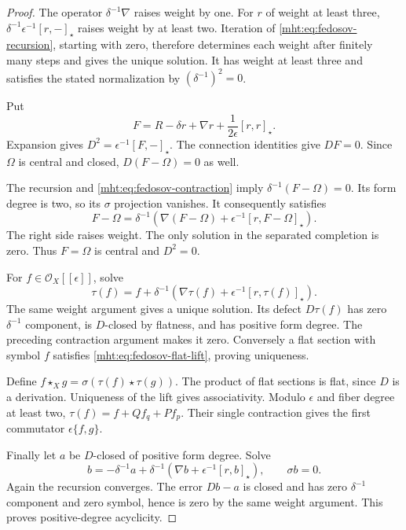 \begin{proof}
The operator $\delta^{-1}\nabla$ raises weight by one.
For $r$ of weight at least three,
$\delta^{-1}\epsilon^{-1}[r,-]_\star$ raises weight by at least
two. Iteration of \eqref{mht:eq:fedosov-recursion}, starting with
zero, therefore determines each weight after finitely many
steps and gives the unique solution. It has weight at least three
and satisfies the stated normalization by $(\delta^{-1})^2=0$.

Put
\[
 F=R-\delta r+\nabla r+\frac1{2\epsilon}[r,r]_\star.
\]
Expansion gives $D^2=\epsilon^{-1}[F,-]_\star$. The connection
identities give $DF=0$. Since $\Omega$ is central and closed,
$D(F-\Omega)=0$ as well.

The recursion and
\eqref{mht:eq:fedosov-contraction} imply
$\delta^{-1}(F-\Omega)=0$. Its form degree is two, so its
$\sigma$ projection vanishes. It consequently satisfies
\[
 F-\Omega
 =\delta^{-1}\left(\nabla(F-\Omega)
               +\epsilon^{-1}[r,F-\Omega]_\star\right).
\]
The right side raises weight. The only solution in the separated
completion is zero. Thus $F=\Omega$ is central and $D^2=0$.

For $f\in\mathcal O_X[[\epsilon]]$, solve
\begin{equation}\label{mht:eq:fedosov-flat-lift}
 \tau(f)=f+\delta^{-1}\left(\nabla\tau(f)
                         +\epsilon^{-1}[r,\tau(f)]_\star\right).
\end{equation}
The same weight argument gives a unique solution. Its defect
$D\tau(f)$ has zero $\delta^{-1}$ component, is $D$-closed by
flatness, and has positive form degree. The preceding contraction
argument makes it zero. Conversely a flat section with symbol $f$
satisfies \eqref{mht:eq:fedosov-flat-lift}, proving uniqueness.

Define $f\star_X g=\sigma(\tau(f)\star\tau(g))$.
The product of flat sections is flat, since $D$ is a derivation.
Uniqueness of the lift gives associativity. Modulo $\epsilon$ and fiber degree at least two,
$\tau(f)=f+Qf_q+Pf_p$. Their single contraction gives
the first commutator $\epsilon\{f,g\}$.

Finally let $a$ be $D$-closed of positive form degree. Solve
\[
 b=-\delta^{-1}a+
        \delta^{-1}\left(\nabla b+\epsilon^{-1}[r,b]_\star\right),
 \qquad \sigma b=0.
\]
Again the recursion converges. The error $Db-a$ is closed and
has zero $\delta^{-1}$ component and zero symbol, hence is zero
by the same weight argument. This proves positive-degree
acyclicity.
\end{proof}

